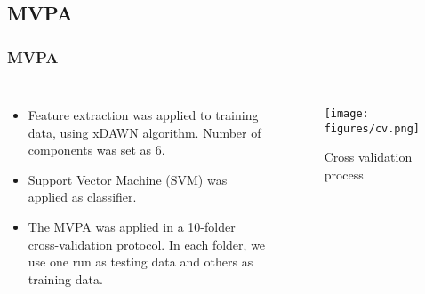 \documentclass[aspectratio=169]{beamer}
\begin{document}
\subsection{MVPA}
\begin{frame}
    \frametitle{MVPA}
    \begin{columns}
        \begin{itemize}
            \item Feature extraction was applied to training data, using xDAWN algorithm.
                  Number of components was set as $6$.
            \item Support Vector Machine (SVM) was applied as classifier.
            \item The MVPA was applied in a 10-folder cross-validation protocol.
                  In each folder, we use one run as testing data and others as training data.
        \end{itemize}

        \begin{figure}[h]
            \centering
            \texttt{[image: figures/cv.png]}
            \caption{Cross validation process}
        \end{figure}

    \end{columns}
\end{frame}
\end{document}
